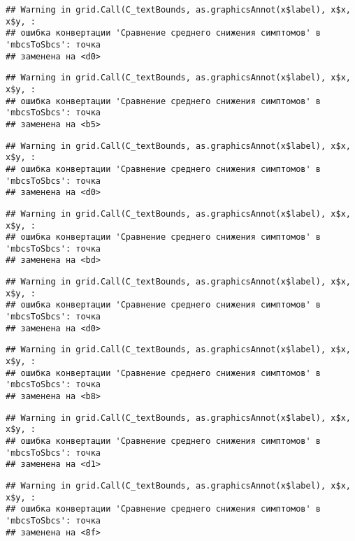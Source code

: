 \documentclass[
]{article}
\begin{document}
\begin{verbatim}
## Warning in grid.Call(C_textBounds, as.graphicsAnnot(x$label), x$x, x$y, :
## ошибка конвертации 'Сравнение среднего снижения симптомов' в 'mbcsToSbcs': точка
## заменена на <d0>
\end{verbatim}

\begin{verbatim}
## Warning in grid.Call(C_textBounds, as.graphicsAnnot(x$label), x$x, x$y, :
## ошибка конвертации 'Сравнение среднего снижения симптомов' в 'mbcsToSbcs': точка
## заменена на <b5>
\end{verbatim}

\begin{verbatim}
## Warning in grid.Call(C_textBounds, as.graphicsAnnot(x$label), x$x, x$y, :
## ошибка конвертации 'Сравнение среднего снижения симптомов' в 'mbcsToSbcs': точка
## заменена на <d0>
\end{verbatim}

\begin{verbatim}
## Warning in grid.Call(C_textBounds, as.graphicsAnnot(x$label), x$x, x$y, :
## ошибка конвертации 'Сравнение среднего снижения симптомов' в 'mbcsToSbcs': точка
## заменена на <bd>
\end{verbatim}

\begin{verbatim}
## Warning in grid.Call(C_textBounds, as.graphicsAnnot(x$label), x$x, x$y, :
## ошибка конвертации 'Сравнение среднего снижения симптомов' в 'mbcsToSbcs': точка
## заменена на <d0>
\end{verbatim}

\begin{verbatim}
## Warning in grid.Call(C_textBounds, as.graphicsAnnot(x$label), x$x, x$y, :
## ошибка конвертации 'Сравнение среднего снижения симптомов' в 'mbcsToSbcs': точка
## заменена на <b8>
\end{verbatim}

\begin{verbatim}
## Warning in grid.Call(C_textBounds, as.graphicsAnnot(x$label), x$x, x$y, :
## ошибка конвертации 'Сравнение среднего снижения симптомов' в 'mbcsToSbcs': точка
## заменена на <d1>
\end{verbatim}

\begin{verbatim}
## Warning in grid.Call(C_textBounds, as.graphicsAnnot(x$label), x$x, x$y, :
## ошибка конвертации 'Сравнение среднего снижения симптомов' в 'mbcsToSbcs': точка
## заменена на <8f>
\end{verbatim}
\end{document}
